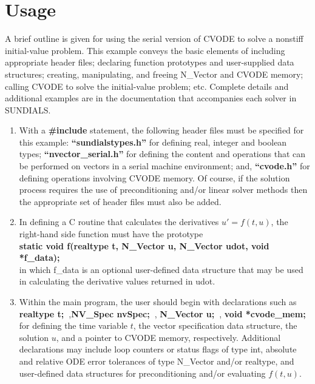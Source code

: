 \section{Usage}

A brief outline is given for using the serial version of CVODE to solve
a nonstiff initial-value problem.
This example conveys the basic elements of including appropriate
header files; declaring function prototypes and user-supplied data
structures; creating, manipulating, and freeing N\_Vector and CVODE
memory; 
calling CVODE to solve the initial-value problem; etc.
Complete details and additional examples are in the documentation that
accompanies each solver in SUNDIALS.

\begin{enumerate}
\item With a {\bf \#include} statement, the following header files must be
specified for this example: {\bf ``sundialstypes.h''} for defining
real, integer and boolean types; {\bf ``nvector\_serial.h''} for
defining the content and operations that can be performed on vectors
in a serial machine environment; and, {\bf ``cvode.h''} for defining
operations involving CVODE memory. Of course, if the solution process
requires the use of preconditioning and/or linear solver methods then
the appropriate set of header files must also be added.

\item In defining a C routine that calculates the derivatives
$u'=f(t,u)$, the right-hand side function must have the prototype \\
{\bf static void f(realtype t, N\_Vector u, N\_Vector udot, void
*f\_data);} \\
in which {f\_data} is an optional user-defined data structure
that may be used in calculating the derivative values returned in {udot}.

\item Within the main program, the user should begin with declarations such as
\\
{\bf realtype t;~},{\bf NV\_Spec nvSpec;~}, {\bf N\_Vector u;~}, {\bf
void *cvode\_mem;~} \\
for defining the time variable $t$, the vector specification data structure, the
solution $u$, and a pointer to CVODE memory, respectively.
Additional declarations may include loop counters or status flags of
type {int}, absolute and relative ODE error tolerances of type
{N\_Vector} and/or {realtype}, and user-defined data structures
for preconditioning and/or evaluating $f(t,u)$.


\end{enumerate}
